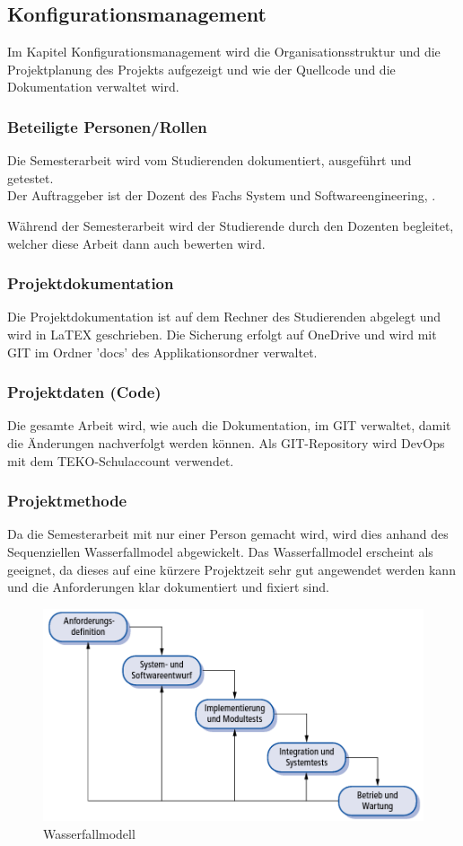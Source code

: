 \subsection{Konfigurationsmanagement}
Im Kapitel Konfigurationsmanagement wird die Organisationsstruktur und die Projektplanung des Projekts aufgezeigt und wie der Quellcode und die Dokumentation verwaltet wird.

\subsubsection{Beteiligte Personen/Rollen}
Die Semesterarbeit wird vom Studierenden dokumentiert, ausgeführt und getestet.\\
Der Auftraggeber ist der Dozent des Fachs System und Softwareengineering, \gutachter.

Während der Semesterarbeit wird der Studierende durch den Dozenten \gutachter begleitet, welcher diese Arbeit dann auch bewerten wird.

\subsubsection{Projektdokumentation}
Die Projektdokumentation ist auf dem Rechner des Studierenden abgelegt und wird in LaTEX geschrieben. Die Sicherung erfolgt auf OneDrive und wird mit GIT im Ordner 'docs' des Applikationsordner verwaltet. 

\subsubsection{Projektdaten (Code)}
Die gesamte Arbeit wird, wie auch die Dokumentation, im GIT verwaltet, damit die Änderungen nachverfolgt werden können. Als GIT-Repository wird DevOps mit dem TEKO-Schulaccount verwendet.

\subsubsection{Projektmethode}
Da die Semesterarbeit mit nur einer Person gemacht wird, wird dies anhand des Sequenziellen Wasserfallmodel abgewickelt. Das Wasserfallmodel erscheint als geeignet, da dieses auf eine kürzere Projektzeit sehr gut angewendet werden kann und die Anforderungen klar dokumentiert und fixiert sind.

\begin{figure}[H]
    \begin{center}
        \includegraphics[width=0.5\linewidth]{content/images/wasserfallmodell.png}
        \caption{Wasserfallmodell}
        \label{fig:wasserfallmodell}
      \end{center}
\end{figure}

